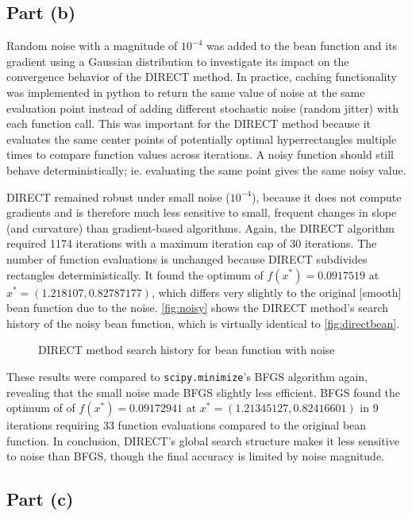 \documentclass{article}
\begin{document}
\subsection*{Part (b)}

Random noise with a magnitude of $10^{-4}$ was added to the bean function and its gradient using a Gaussian distribution to investigate its impact on the convergence behavior of the DIRECT method. In practice, caching functionality was implemented in python to return the same value of noise at the same evaluation point instead of adding different stochastic noise (random jitter) with each function call. This was important for the DIRECT method because it evaluates the same center points of potentially optimal hyperrectangles multiple times to compare function values across iterations. A noisy function should still behave deterministically; ie. evaluating the same point gives the same noisy value. 

DIRECT remained robust under small noise ($10^{-4}$), because it does not compute gradients and is therefore much less sensitive to small, frequent changes in slope (and curvature) than gradient-based algorithms. Again, the DIRECT algorithm required 1174 iterations with a maximum iteration cap of 30 iterations. The number of function evaluations is unchanged because DIRECT subdivides rectangles deterministically. It found the optimum of $f(x^*) = 0.0917519$ at $x^* = (1.218107, 0.82787177)$, which differs very slightly to the original [smooth] bean function due to the noise. \autoref{fig:noisy} shows the DIRECT method's search history of the noisy bean function, which is virtually identical to \autoref{fig:directbean}. 

\begin{figure}[H]
\centering
    \centering
    
    \caption{DIRECT method search history for bean function with noise}
    \label{fig:noisy}
\end{figure}

These results were compared to \texttt{scipy.minimize}'s BFGS algorithm again, revealing that the small noise made BFGS slightly less efficient. BFGS found the optimum of of $f(x^*) = 0.09172941$ at $x^* = (1.21345127, 0.82416601)$ in 9 iterations requiring 33 function evaluations compared to the original bean function. 
In conclusion, DIRECT’s global search structure makes it less sensitive to noise than BFGS, though the final accuracy is limited by noise magnitude.

\subsection*{Part (c)}
\end{document}
